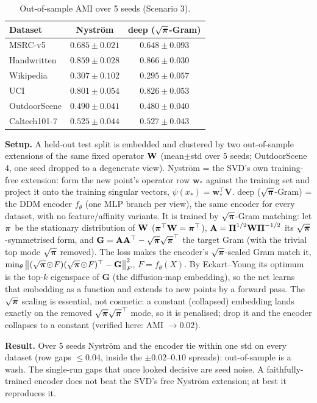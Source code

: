 \begin{table}[H]\centering\footnotesize
\caption{Out-of-sample AMI over 5 seeds (Scenario 3).}
\label{tab:oos}
\begin{tabular}{l c c}
\toprule
Dataset & Nystr\"om & deep ($\sqrt{\boldsymbol{\pi}}$-Gram)\\
\midrule
MSRC-v5      & $0.685\!\pm\!0.021$ & $0.648\!\pm\!0.093$\\
Handwritten  & $0.859\!\pm\!0.028$ & $0.866\!\pm\!0.030$\\
Wikipedia    & $0.307\!\pm\!0.102$ & $0.295\!\pm\!0.057$\\
UCI          & $0.801\!\pm\!0.054$ & $0.826\!\pm\!0.053$\\
OutdoorScene & $0.490\!\pm\!0.041$ & $0.480\!\pm\!0.040$\\
Caltech101-7 & $0.525\!\pm\!0.044$ & $0.527\!\pm\!0.043$\\
\bottomrule
\end{tabular}
\end{table}

\noindent\textbf{Setup.} A held-out test split is embedded and clustered by two out-of-sample extensions
of the same fixed operator $\mathbf{W}$ (mean$\pm$std over 5 seeds; OutdoorScene 4, one seed dropped to a
degenerate view). Nystr\"om = the SVD's own training-free extension: form the new point's operator
row $\mathbf w_*$ against the training set and project it onto the training singular vectors,
$\psi(x_*)=\mathbf w_*^\top\mathbf V$. deep ($\sqrt{\boldsymbol{\pi}}$-Gram) = the DDM encoder $f_\theta$ (one
MLP branch per view), the same encoder for every dataset, with no feature/affinity variants. It is
trained by $\sqrt{\boldsymbol{\pi}}$-Gram matching: let $\boldsymbol{\pi}$ be the stationary distribution of $\mathbf{W}$
($\boldsymbol{\pi}^\top\mathbf{W}=\boldsymbol{\pi}^\top$), $\mathbf{A}=\boldsymbol{\Pi}^{1/2}\mathbf{W}\boldsymbol{\Pi}^{-1/2}$ its $\sqrt{\boldsymbol{\pi}}$-symmetrised form, and
$\mathbf G=\mathbf{A}\mathbf{A}^\top-\sqrt{\boldsymbol{\pi}}\sqrt{\boldsymbol{\pi}}^\top$ the target Gram (with the trivial top mode $\sqrt{\boldsymbol{\pi}}$
removed). The loss makes the encoder's $\sqrt{\boldsymbol{\pi}}$-scaled Gram match it,
$\min_\theta\big\lVert(\sqrt{\boldsymbol{\pi}}\!\odot\!F)(\sqrt{\boldsymbol{\pi}}\!\odot\!F)^\top-\mathbf G\big\rVert_F^2$,
$F=f_\theta(X)$. By Eckart--Young its optimum is the top-$k$ eigenspace of $\mathbf G$ (the diffusion-map
embedding), so the net learns that embedding as a function and extends to new points by a forward
pass. The $\sqrt{\boldsymbol{\pi}}$ scaling is essential, not cosmetic: a constant (collapsed) embedding lands exactly
on the removed $\sqrt{\boldsymbol{\pi}}\sqrt{\boldsymbol{\pi}}^\top$ mode, so it is penalised; drop it and the encoder collapses to
a constant (verified here: AMI $\to0.02$).

\noindent\textbf{Result.} Over 5 seeds Nystr\"om and the encoder tie within one std on every
dataset (row gaps $\le0.04$, inside the $\pm0.02$--$0.10$ spreads): out-of-sample is a wash. The
single-run gaps that once looked decisive are seed noise. A faithfully-trained encoder does not beat the
SVD's free Nystr\"om extension; at best it reproduces it.

